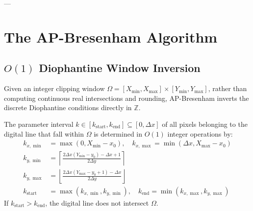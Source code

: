 \documentclass[runningheads]{llncs}
\begin{document}
---

\section{The AP-Bresenham Algorithm}
\label{sec:algo}

\subsection{$O(1)$ Diophantine Window Inversion}
Given an integer clipping window $\Omega = [X_{\min}, X_{\max}] \times [Y_{\min}, Y_{\max}]$, rather than computing continuous real intersections and rounding, AP-Bresenham inverts the discrete Diophantine conditions directly in $\mathbb{Z}$.

\begin{theorem}
\label{thm:diophantine_bounds}
The parameter interval $k \in [k_{\mathrm{start}}, k_{\mathrm{end}}] \subseteq [0, \Delta x]$ of all pixels belonging to the digital line that fall within $\Omega$ is determined in $O(1)$ integer operations by:
\begin{align}
    k_{x,\min} &= \max(0, X_{\min} - x_0), \quad k_{x,\max} = \min(\Delta x, X_{\max} - x_0) \\
    k_{y,\min} &= \left\lceil \frac{2\Delta x (Y_{\min} - y_0) - \Delta x + 1}{2\Delta y} \right\rceil \label{eq:ky_min} \\
    k_{y,\max} &= \left\lfloor \frac{2\Delta x (Y_{\max} - y_0 + 1) - \Delta x}{2\Delta y} \right\rfloor \label{eq:ky_max} \\
    k_{\mathrm{start}} &= \max(k_{x,\min}, k_{y,\min}), \quad k_{\mathrm{end}} = \min(k_{x,\max}, k_{y,\max})
\end{align}
If $k_{\mathrm{start}} > k_{\mathrm{end}}$, the digital line does not intersect $\Omega$.
\end{theorem}
\end{document}
